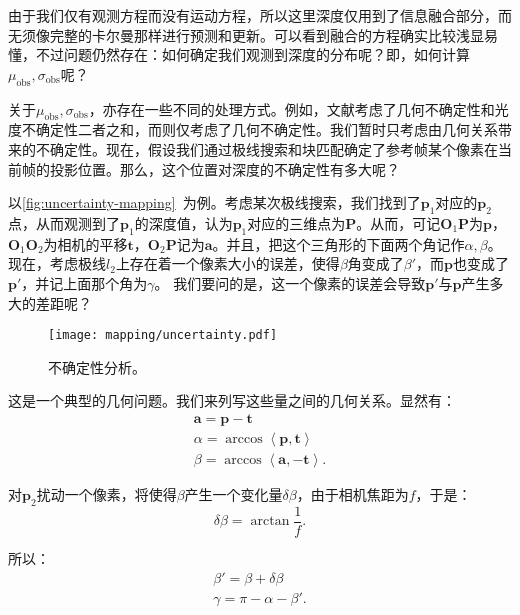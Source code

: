 由于我们仅有观测方程而没有运动方程，所以这里深度仅用到了信息融合部分，而无须像完整的卡尔曼那样进行预测和更新。可以看到融合的方程确实比较浅显易懂，不过问题仍然存在：如何确定我们观测到深度的分布呢？即，如何计算$\mu_{\mathrm{obs}}, \sigma_{\mathrm{obs}}$呢？

关于$\mu_{\mathrm{obs}}, \sigma_{\mathrm{obs}}$，亦存在一些不同的处理方式。例如，文献\cite{Engel2013}考虑了几何不确定性和光度不确定性二者之和，而\cite{Vogiatzis2011}则仅考虑了几何不确定性。我们暂时只考虑由几何关系带来的不确定性。现在，假设我们通过极线搜索和块匹配确定了参考帧某个像素在当前帧的投影位置。那么，这个位置对深度的不确定性有多大呢？

以\autoref{fig:uncertainty-mapping}~为例。考虑某次极线搜索，我们找到了$\bm{p}_1$对应的$\bm{p}_2$点，从而观测到了$\bm{p}_1$的深度值，认为$\bm{p}_1$对应的三维点为$\bm{P}$。从而，可记$\bm{O}_1 \bm{P}$为$\bm{p}$，$\bm{O}_1 \bm{O}_2$为相机的平移$\bm{t}$，$\bm{O}_2 \bm{P}$记为$\bm{a}$。并且，把这个三角形的下面两个角记作$\alpha, \beta$。现在，考虑极线$l_2$上存在着一个像素大小的误差，使得$\beta$角变成了$\beta'$，而$\bm{p}$也变成了$\bm{p}'$，并记上面那个角为$\gamma$。 我们要问的是，这一个像素的误差会导致$\bm{p}'$与$\bm{p}$产生多大的差距呢？

\begin{figure}[!ht]
	\centering
	\texttt{[image: mapping/uncertainty.pdf]}
	\caption{不确定性分析。}
	\label{fig:uncertainty-mapping}
\end{figure}

这是一个典型的几何问题。我们来列写这些量之间的几何关系。显然有：
\begin{equation}
\begin{array}{l}
\bm{a} = \bm{p} - \bm{t} \\
\alpha  = \arccos \left\langle {\bm{p}, \bm{t}} \right\rangle \\
\beta  = \arccos \left\langle {\bm{a}, - \bm{t}} \right\rangle .
\end{array}
\end{equation}

对$\bm{p}_2$扰动一个像素，将使得$\beta$产生一个变化量$\delta \beta$，由于相机焦距为$f$，于是：
\begin{equation}
\delta \beta  = \arctan \frac{1}{f}.
\end{equation}

所以：
\begin{equation}
\begin{array}{l}
\beta ' = \beta  + \delta \beta \\
\gamma  = \pi  - \alpha  - \beta '.
\end{array}
\end{equation}

